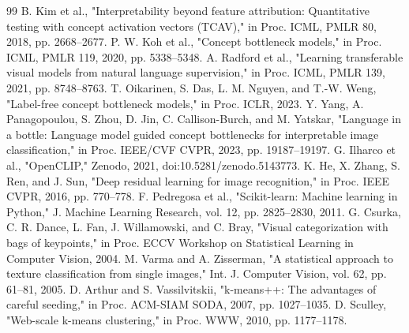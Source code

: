 \documentclass[conference]{IEEEtran}
\begin{document}
\begin{thebibliography}{99}
 B. Kim et al., "Interpretability beyond feature attribution: Quantitative testing with concept activation vectors (TCAV)," in Proc. ICML, PMLR 80, 2018, pp. 2668--2677.
 P. W. Koh et al., "Concept bottleneck models," in Proc. ICML, PMLR 119, 2020, pp. 5338--5348.
 A. Radford et al., "Learning transferable visual models from natural language supervision," in Proc. ICML, PMLR 139, 2021, pp. 8748--8763.
 T. Oikarinen, S. Das, L. M. Nguyen, and T.-W. Weng, "Label-free concept bottleneck models," in Proc. ICLR, 2023.
 Y. Yang, A. Panagopoulou, S. Zhou, D. Jin, C. Callison-Burch, and M. Yatskar, "Language in a bottle: Language model guided concept bottlenecks for interpretable image classification," in Proc. IEEE/CVF CVPR, 2023, pp. 19187--19197.
 G. Ilharco et al., "OpenCLIP," Zenodo, 2021, doi:10.5281/zenodo.5143773.
 K. He, X. Zhang, S. Ren, and J. Sun, "Deep residual learning for image recognition," in Proc. IEEE CVPR, 2016, pp. 770--778.
 F. Pedregosa et al., "Scikit-learn: Machine learning in Python," J. Machine Learning Research, vol. 12, pp. 2825--2830, 2011.
 G. Csurka, C. R. Dance, L. Fan, J. Willamowski, and C. Bray, "Visual categorization with bags of keypoints," in Proc. ECCV Workshop on Statistical Learning in Computer Vision, 2004.
 M. Varma and A. Zisserman, "A statistical approach to texture classification from single images," Int. J. Computer Vision, vol. 62, pp. 61--81, 2005.
 D. Arthur and S. Vassilvitskii, "k-means++: The advantages of careful seeding," in Proc. ACM-SIAM SODA, 2007, pp. 1027--1035.
 D. Sculley, "Web-scale k-means clustering," in Proc. WWW, 2010, pp. 1177--1178.
\end{thebibliography}
\end{document}
